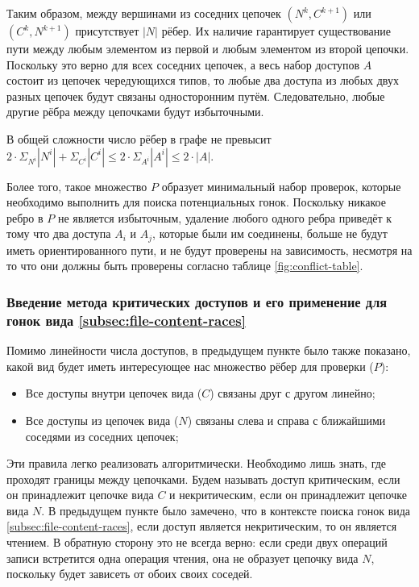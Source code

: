 Таким образом, между вершинами из соседних цепочек $(N^k, C^{k+1})$ или $(C^k, N^{k+1})$ присутствует $|N|$ рёбер. Их наличие гарантирует существование пути между любым элементом из первой и любым элементом из второй цепочки. Поскольку это верно для всех соседних цепочек, а весь набор доступов $A$ состоит из цепочек чередующихся типов, то любые два доступа из любых двух разных цепочек будут связаны односторонним путём. Следовательно, любые другие рёбра между цепочками будут избыточными.

В общей сложности число рёбер в графе не превысит $2 \cdot \Sigma_{N^i} |N^i| + \Sigma_{C^i} |C^i| \leq 2 \cdot \Sigma_{A^i} |A^i| \leq 2 \cdot |A|$.

Более того, такое множество $P$ образует минимальный набор проверок, которые необходимо выполнить для поиска потенциальных гонок. Поскольку никакое ребро в $P$ не является избыточным, удаление любого одного ребра приведёт к тому что два доступа $A_i$ и $A_j$, которые были им соединены, больше не будут иметь ориентированного пути, и не будут проверены на зависимость, несмотря на то что они должны быть проверены согласно таблице \ref{fig:conflict-table}.

\subsubsection{Введение метода критических доступов и его применение для гонок вида \ref{subsec:file-content-races}}

Помимо линейности числа доступов, в предыдущем пункте было также показано, какой вид будет иметь интересующее нас множество рёбер для проверки ($P$):

\begin{itemize}
    \item Все доступы внутри цепочек вида ($C$) связаны друг с другом линейно;
    \item Все доступы из цепочек вида ($N$) связаны слева и справа с ближайшими соседями из соседних цепочек;
\end{itemize}

Эти правила легко реализовать алгоритмически. Необходимо лишь знать, где проходят границы между цепочками. Будем называть доступ критическим, если он принадлежит цепочке вида $C$ и некритическим, если он принадлежит цепочке вида $N$. В предыдущем пункте было замечено, что в контексте поиска гонок вида \ref{subsec:file-content-races}, если доступ является некритическим, то он является чтением. В обратную сторону это не всегда верно: если среди двух операций записи встретится одна операция чтения, она не образует цепочку вида $N$, поскольку будет зависеть от обоих своих соседей.

